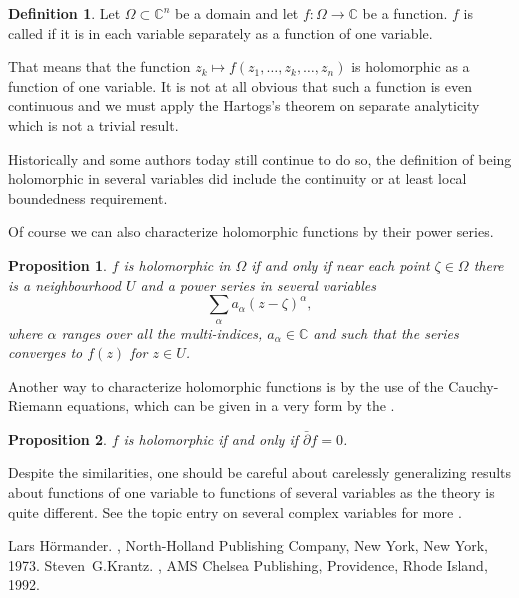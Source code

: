 \documentclass[12pt]{article}
\theoremstyle{theorem}
\newtheorem*{prop}{Proposition}
\theoremstyle{definition}
\newtheorem*{defn}{Definition}
\theoremstyle{remark}
\begin{document}
\begin{defn}
Let $\Omega \subset {\mathbb{C}}^n$ be a domain and let $f \colon \Omega \to
{\mathbb{C}}$ be a function.  $f$ is called {\em {}} if it is
 in each variable separately as a function of one variable.
\end{defn}

That means that the function $z_k \mapsto f(z_1,\ldots,z_k,\ldots,z_n)$
is holomorphic as a function of one variable.  It is not at all obvious that
such a function is even continuous and we must apply the Hartogs's theorem on separate
analyticity which is not a trivial result.

Historically and some authors today still continue to do so, the definition
of being holomorphic in several variables did include the continuity or at
least local boundedness requirement.

Of course we can also characterize holomorphic functions by their power series.

\begin{prop}
$f$ is holomorphic in $\Omega$ if and only if near each point $\zeta \in \Omega$ there is a neighbourhood
$U$ and a power series in several variables
\begin{equation*}
\sum_{\alpha} a_\alpha (z-\zeta)^\alpha ,
\end{equation*}
where $\alpha$ ranges over all the
multi-indices, $a_\alpha \in {\mathbb{C}}$ and such that the series converges to $f(z)$ for $z \in U$.
\end{prop}

Another way to characterize holomorphic functions is by the use of the
Cauchy-Riemann equations, which can be given in a very  form by the
.

\begin{prop}
$f$ is holomorphic if and only if $\bar{\partial} f = 0$.
\end{prop}

Despite the similarities,
one should be careful about carelessly generalizing results about functions
of one variable to functions of several variables as the theory is quite
different.  See the topic entry on several complex variables for more
.

\begin{thebibliography}{9}
Lars H\"ormander.
{\em {}},
North-Holland Publishing Company, New York, New York, 1973.
Steven~G.\@ Krantz.
{\em {}},
AMS Chelsea Publishing, Providence, Rhode Island, 1992.
\end{thebibliography}
\end{document}
